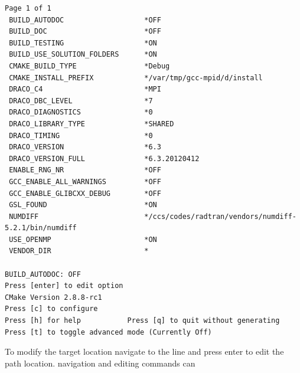 \begin{lstlisting}[basicstyle=\footnotesize, xleftmargin=0.0in, xrightmargin=0.0in, caption={The \comp{ccmake} screen after the initial configure command.}, float=htn, label={lst:ccmake-post-configure}]
                                                     Page 1 of 1
 BUILD_AUTODOC                   *OFF                                                    
 BUILD_DOC                       *OFF                                                    
 BUILD_TESTING                   *ON                                                     
 BUILD_USE_SOLUTION_FOLDERS      *ON                                                     
 CMAKE_BUILD_TYPE                *Debug                                                  
 CMAKE_INSTALL_PREFIX            */var/tmp/gcc-mpid/d/install                        
 DRACO_C4                        *MPI                                                    
 DRACO_DBC_LEVEL                 *7                                                      
 DRACO_DIAGNOSTICS               *0                                                      
 DRACO_LIBRARY_TYPE              *SHARED                                                 
 DRACO_TIMING                    *0                                                      
 DRACO_VERSION                   *6.3                                                    
 DRACO_VERSION_FULL              *6.3.20120412                                           
 ENABLE_RNG_NR                   *OFF                                                    
 GCC_ENABLE_ALL_WARNINGS         *OFF                                                    
 GCC_ENABLE_GLIBCXX_DEBUG        *OFF                                                    
 GSL_FOUND                       *ON                                                     
 NUMDIFF                         */ccs/codes/radtran/vendors/numdiff-5.2.1/bin/numdiff   
 USE_OPENMP                      *ON                                                     
 VENDOR_DIR                      *              

BUILD_AUTODOC: OFF                                                                                                                                                         
Press [enter] to edit option                                       CMake Version 2.8.8-rc1
Press [c] to configure
Press [h] for help           Press [q] to quit without generating
Press [t] to toggle advanced mode (Currently Off)
\end{lstlisting}
To modify the target location navigate to the  line and press enter to edit the path location.   navigation and editing commands can
